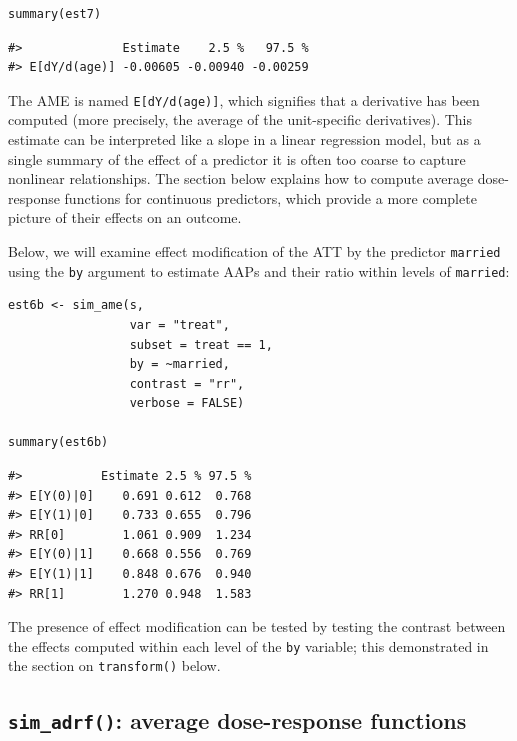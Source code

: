 \begin{verbatim}
summary(est7)
\end{verbatim}

\begin{verbatim}
#>              Estimate    2.5 %   97.5 %
#> E[dY/d(age)] -0.00605 -0.00940 -0.00259
\end{verbatim}

The AME is named \texttt{E{[}dY/d(age){]}}, which signifies that a derivative has been computed (more precisely, the average of the unit-specific derivatives). This estimate can be interpreted like a slope in a linear regression model, but as a single summary of the effect of a predictor it is often too coarse to capture nonlinear relationships. The section below explains how to compute average dose-response functions for continuous predictors, which provide a more complete picture of their effects on an outcome.

Below, we will examine effect modification of the ATT by the predictor \texttt{married} using the \texttt{by} argument to estimate AAPs and their ratio within levels of \texttt{married}:

\begin{verbatim}
est6b <- sim_ame(s,
                 var = "treat",
                 subset = treat == 1,
                 by = ~married,
                 contrast = "rr",
                 verbose = FALSE)

summary(est6b)
\end{verbatim}

\begin{verbatim}
#>           Estimate 2.5 % 97.5 %
#> E[Y(0)|0]    0.691 0.612  0.768
#> E[Y(1)|0]    0.733 0.655  0.796
#> RR[0]        1.061 0.909  1.234
#> E[Y(0)|1]    0.668 0.556  0.769
#> E[Y(1)|1]    0.848 0.676  0.940
#> RR[1]        1.270 0.948  1.583
\end{verbatim}

The presence of effect modification can be tested by testing the contrast between the effects computed within each level of the \texttt{by} variable; this demonstrated in the section on \texttt{transform()} below.

\subsection{\texorpdfstring{\texttt{sim\_adrf()}: average dose-response functions}{sim\_adrf(): average dose-response functions}}\label{sim_adrf-average-dose-response-functions}

